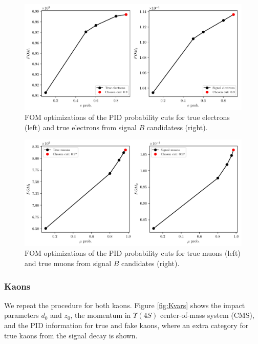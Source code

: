 \begin{figure}[!htb]
	\centering
	\captionsetup{width=.8\linewidth}
	\includegraphics[width=\linewidth]{fig/FSP_e_fom}
	\caption{$\mathrm{FOM}$ optimizations of the PID probability cuts for true electrons (left) and true electrons from signal $B$ candidatess (right).}
	\label{fig:efom}
\end{figure}

\begin{figure}[!htb]
	\centering
	\captionsetup{width=.8\linewidth}
	\includegraphics[width=\linewidth]{fig/FSP_mu_fom}
	\caption{$\mathrm{FOM}$ optimizations of the PID probability cuts for true muons (left) and true muons from signal $B$ candidates (right).}
	\label{fig:mufom}
\end{figure}


\subsubsection{Kaons}

We repeat the procedure for both kaons. Figure \ref{fig:Kvars} shows the impact parameters $d_0$ and $z_0$, the momentum in  $\Upsilon(4S)$ center-of-mass system (CMS), and the PID information for true and fake kaons, where an extra category for true kaons from the signal decay is shown.

